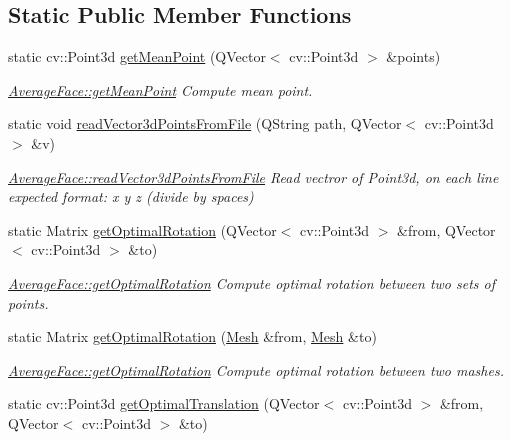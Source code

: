 \subsection*{Static Public Member Functions}
\begin{DoxyCompactItemize}
\item 
static cv\+::\+Point3d \hyperlink{class_average_face_a66b5338e651aad5d16f127cda65bf800}{get\+Mean\+Point} (Q\+Vector$<$ cv\+::\+Point3d $>$ \&points)
\begin{DoxyCompactList}\small\item\em \hyperlink{class_average_face_a66b5338e651aad5d16f127cda65bf800}{Average\+Face\+::get\+Mean\+Point} Compute mean point. \end{DoxyCompactList}\item 
static void \hyperlink{class_average_face_a73089a0a62d090011dca519ac6fd981f}{read\+Vector3d\+Points\+From\+File} (Q\+String path, Q\+Vector$<$ cv\+::\+Point3d $>$ \&v)
\begin{DoxyCompactList}\small\item\em \hyperlink{class_average_face_a73089a0a62d090011dca519ac6fd981f}{Average\+Face\+::read\+Vector3d\+Points\+From\+File} Read vectror of Point3d, on each line expected format\+: x y z (divide by spaces) \end{DoxyCompactList}\item 
static Matrix \hyperlink{class_average_face_a9e4a09d51f12ac0b79a2afc6ab0c8f8b}{get\+Optimal\+Rotation} (Q\+Vector$<$ cv\+::\+Point3d $>$ \&from, Q\+Vector$<$ cv\+::\+Point3d $>$ \&to)
\begin{DoxyCompactList}\small\item\em \hyperlink{class_average_face_a9e4a09d51f12ac0b79a2afc6ab0c8f8b}{Average\+Face\+::get\+Optimal\+Rotation} Compute optimal rotation between two sets of points. \end{DoxyCompactList}\item 
static Matrix \hyperlink{class_average_face_a1d22969a037f365a609dbe46032b7fa5}{get\+Optimal\+Rotation} (\hyperlink{class_mesh}{Mesh} \&from, \hyperlink{class_mesh}{Mesh} \&to)
\begin{DoxyCompactList}\small\item\em \hyperlink{class_average_face_a9e4a09d51f12ac0b79a2afc6ab0c8f8b}{Average\+Face\+::get\+Optimal\+Rotation} Compute optimal rotation between two mashes. \end{DoxyCompactList}\item 
static cv\+::\+Point3d \hyperlink{class_average_face_a6e52724e6f4d6479039256ac5f13585b}{get\+Optimal\+Translation} (Q\+Vector$<$ cv\+::\+Point3d $>$ \&from, Q\+Vector$<$ cv\+::\+Point3d $>$ \&to)

\end{DoxyCompactItemize}

